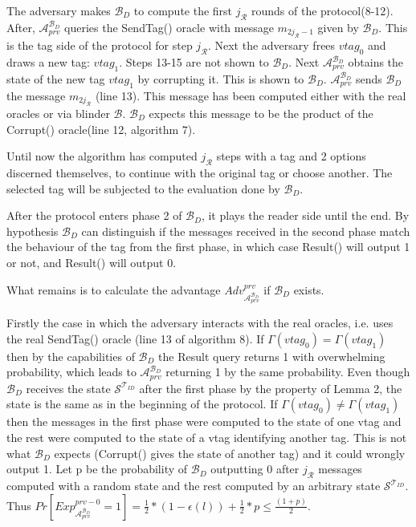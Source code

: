     The adversary makes $\mathcal{B}_D$ to compute the first $j_{\mathcal{R}}$ rounds of the protocol(8-12). After, $\mathcal{A}_{prv}^{\mathcal{B}_D}$ queries the 
    SendTag() oracle with message $m_{2j_{\mathcal{R}}-1}$ given by $\mathcal{B}_D$. This is the tag side of the protocol for step $j_{\mathcal{R}}$. Next the adversary
    frees $vtag_{0}$ and draws a new tag: $vtag_{1}$. Steps 13-15 are not shown to $\mathcal{B}_D$. Next $\mathcal{A}_{prv}^{\mathcal{B}_D}$ obtains the state of
    the new tag $vtag_{1}$ by corrupting it. This is shown to $\mathcal{B}_D$. $\mathcal{A}_{prv}^{\mathcal{B}_D}$ sends $\mathcal{B}_D$ the message $m_{2j_{\mathcal{R}}}$ 
    (line 13). This message has been computed either with the real oracles or via blinder $\mathcal{B}$. $\mathcal{B}_D$ expects this message to be the product of the Corrupt()
    oracle(line 12, algorithm 7).

    Until now the algorithm has computed $j_{\mathcal{R}}$ steps with a tag and 2 options discerned themselves, to continue with the original tag or choose another. The selected 
    tag will be subjected to the evaluation done by $\mathcal{B}_D$. 

    After the protocol enters phase 2 of $\mathcal{B}_D$, it plays the reader side until the end. By hypothesis $\mathcal{B}_D$ can distinguish if the messages received in the second
    phase match the behaviour of the tag from the first phase, in which case Result() will output 1 or not, and Result() will output 0. 
    
    What remains is to calculate the advantage $Adv_{\mathcal{A}_{prv}^{\mathcal{B}_D}}^{prv}$ if $\mathcal{B}_D$ exists.

    Firstly the case in which the adversary interacts with the real oracles, i.e. uses the real SendTag() oracle (line 13 of algorithm 8). If
    $\Gamma(vtag_0) = \Gamma(vtag_1)$ then by the capabilities of $\mathcal{B}_D$ the Result query returns 1 with overwhelming probability, which
    leads to $\mathcal{A}_{prv}^{\mathcal{B}_D}$ returning 1 by the same probability. Even though $\mathcal{B}_D$ receives the state
    $\mathcal{S}^{\mathcal{T}_{ID}}$ after the first phase by the property of Lemma 2, the state is the same as in the beginning of the protocol.
    If $\Gamma(vtag_0) \neq \Gamma(vtag_1)$ then the messages in the first phase were computed to the state of one vtag and the rest were computed
    to the state of a vtag identifying another tag. This is not what $\mathcal{B}_D$ expects (Corrupt() gives the state of another tag) and it could wrongly output 1. Let p be the probability
    of $\mathcal{B}_D$ outputting 0 after $j_\mathcal{R}$ messages computed with a random state and the rest computed by an arbitrary state 
    $\mathcal{S}^{\mathcal{T}_{ID}}$. Thus $Pr[Exp_{\mathcal{A}_{prv}^{\mathcal{B}_D}}^{prv-0} = 1] = \frac{1}{2}*(1-\epsilon(l))
    +\frac{1}{2}*p \leq \frac{(1+p)}{2}.$

